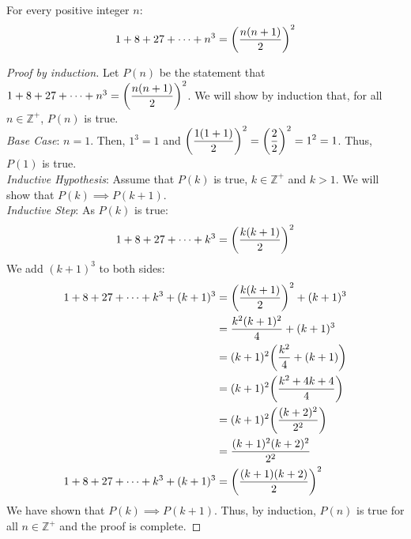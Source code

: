 \documentclass[11pt]{scrartcl}
\theoremstyle{dotlessP}
\theoremstyle{dotlessN}
\DeclarePairedDelimiter\paren{(}{)} %
\newcommand{\ints}{\mathbb{Z}}
\begin{document}
	\begin{claim*}
		For every positive integer $n$:
		\[
			1 + 8 + 27 + \dots + n^3 = \paren*{\frac{n(n+1)}{2}}^2
		\] 
	\end{claim*}
	\begin{proof}
		[Proof by induction]
		Let $P(n)$ be the statement that $1 + 8 + 27 + \dots + n^3  = \displaystyle\paren*{\frac{n(n+1)}{2}}^2$. We will show by induction that, for all $n \in \ints^+$, $P(n)$ is true.
		\\

		\textit{Base Case}: $n = 1$. Then, $1^3 = 1$ and $\displaystyle\paren*{\frac{1(1+1)}{2}}^2 = \displaystyle\paren*{\frac{2}{2}}^2 =  1^2 = 1$. Thus, $P(1)$ is true.
		\\

		\textit{Inductive Hypothesis}: Assume that $P(k)$ is true, $k \in \ints^+$ and $k > 1$. We will show that $P(k) \implies P(k+1)$.
		\\

		\textit{Inductive Step}: As $P(k)$ is true:
		\[
		1 + 8 + 27 + \dots + k^3 = \paren*{\frac{k(k+1)}{2}}^2		
		\] 
		We add $(k+1)^3 $ to both sides:
		\begin{align*}
			1 + 8 + 27 + \dots + k^3 + (k+1)^3 &= \paren*{\frac{k(k+1)}{2}}^2 + (k+1)^3 \\
										   &= \frac{k^2(k+1)^2}{4} + (k+1)^3 \\
										   &= (k+1)^2 \paren*{\frac{k^2}{4} + (k+1)} \\
										   &= (k+1)^2 \paren*{\frac{k^2 + 4k + 4}{4}} \\
										   &= (k+1)^2 \paren*{\frac{(k+2)^2}{2^2}} \\
										   &= \frac{(k+1)^2(k+2)^2}{2^2} \\
			1 + 8 + 27 + \dots + k^3 + (k+1)^3 &= \paren*{\frac{(k+1)(k+2)}{2}}^2
		\end{align*}
		We have shown that $P(k) \implies P(k+1)$. Thus, by induction, $P(n)$ is true for all $n \in \ints^+$ and the proof is complete.
	\end{proof}
\end{document}
